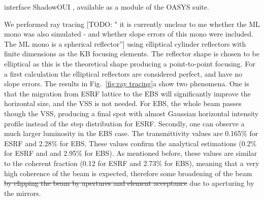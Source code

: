\documentclass{iucr}              %
\newcommand{\todo}[1]{{\color{red}[TODO: "#1'']}}
\begin{document}
interface ShadowOUI \cite{codeSHADOWOUI}, available as a module of the OASYS suite.

We performed ray tracing \todo{ it is currently unclear to me whether the ML mono was also simulated - and whether slope errors of this mono were included. The ML mono is a spherical reflector} using elliptical cylinder reflectors with finite dimensions as the KB focusing elements. The reflector shape is chosen to be elliptical as this is the theoretical shape producing a point-to-point focusing. For a first calculation  the elliptical  reflectors are considered perfect, and have no slope errors. 
The results in Fig.~\ref{fig:ray tracing}a show two phenomena. One is that the migration from ESRF lattice to the EBS will significantly improve the horizontal size, and the VSS is not needed. For EBS, the whole beam passes though the VSS, producing a final spot with almost Gaussian horizontal intensity profile instead of the step distribution for ESRF. Secondly, one can observe a much larger luminosity in the EBS case. The transmittivity values are 0.165\% for ESRF and 2.28\% for EBS. These values confirm the analytical estimations (0.2\% for ESRF and and 2.95\% for EBS). As mentioned before, these values are similar to the coherent fraction \cite{arxivCF} (0.12 for ESRF and 2.73\% for EBS), meaning that a very high coherence of the beam is expected, therefore some broadening of the beam {\color{green}\sout{by clipping the beam by apertures and element acceptance} due to aperturing by the mirrors.} 
\end{document}
